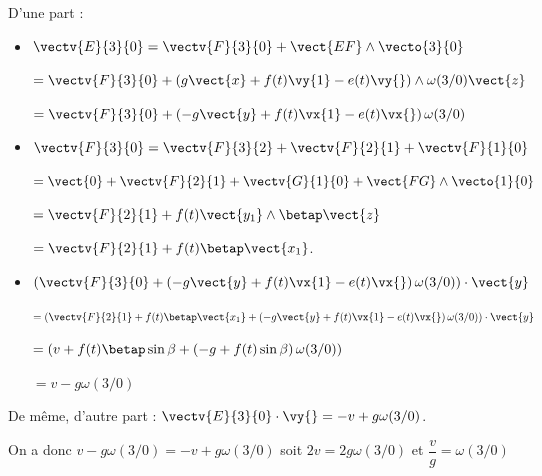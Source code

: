 %
%
%
%
%


\ifprof
\begin{corrige}
D'une part :
\begin{itemize}
\item $\vectv{E}{3}{0} = \vectv{F}{3}{0} + \vect{EF}\wedge \vecto{3}{0}$

$= \vectv{F}{3}{0} + \left( g\vect{x} + f(t) \vy{1} - e(t) \vy{} \right)\wedge \omega(3/0) \vect{z}$ 

$= \vectv{F}{3}{0} + \left( -g\vect{y} + f(t) \vx{1} - e(t) \vx{} \right)\omega(3/0)$ 
\item $\vectv{F}{3}{0} = \vectv{F}{3}{2} + \vectv{F}{2}{1}+ \vectv{F}{1}{0}$ 

$= \vect{0} + \vectv{F}{2}{1}+ \vectv{G}{1}{0} + \vect{FG}\wedge \vecto{1}{0}$ 

$=  \vectv{F}{2}{1}+ f(t)\vect{y_1}\wedge \betap \vect{z}$  

$=  \vectv{F}{2}{1}+ f(t)  \betap  \vect{x_1}$.  

\item $\left(\vectv{F}{3}{0} + \left( -g\vect{y} + f(t) \vx{1} - e(t) \vx{} \right)\omega(3/0)\right)\cdot \vect{y}$

$=\left(\vectv{F}{2}{1}+ f(t)  \betap  \vect{x_1} + \left( -g\vect{y} + f(t) \vx{1} - e(t) \vx{} \right)\omega(3/0)\right)\cdot \vect{y}$

$=\left(v+ f(t)  \betap  \sin\beta  + \left( -g + f(t) \sin\beta  \right)\omega(3/0)\right)$


$=v -g \omega(3/0)$


\end{itemize}

De même, d'autre part : $\vectv{E}{3}{0} \cdot \vy{} = -v +g \omega(3/0)$.

On a donc $v -g \omega(3/0) = -v +g \omega(3/0)$ soit $2v =  2g \omega(3/0)$ et $\dfrac{v}{g} =  \omega(3/0)$
\end{corrige}
\else
\fi


